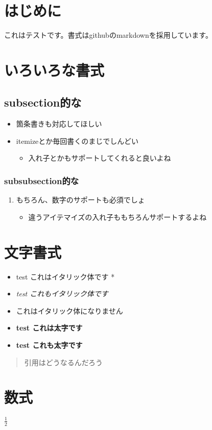 \section{はじめに}\label{ux306fux3058ux3081ux306b}

これはテストです。書式はgithubのmarkdownを採用しています。

\section{いろいろな書式}\label{ux3044ux308dux3044ux308dux306aux66f8ux5f0f}

\subsection{subsection的な}\label{subsectionux7684ux306a}

\begin{itemize}
\itemsep1pt\parskip0pt
\item
  箇条書きも対応してほしい
\item
  itemizeとか毎回書くのまじでしんどい

  \begin{itemize}
  \itemsep1pt\parskip0pt
  \item
    入れ子とかもサポートしてくれると良いよね
  \end{itemize}
\end{itemize}

\subsubsection{subsubsection的な}\label{subsubsectionux7684ux306a}

\begin{enumerate}
\def\labelenumi{\arabic{enumi}.}
\itemsep1pt\parskip0pt
\item
  もちろん、数字のサポートも必須でしょ

  \begin{itemize}
  \itemsep1pt\parskip0pt
  \item
    違うアイテマイズの入れ子ももちろんサポートするよね
  \end{itemize}
\end{enumerate}

\section{文字書式}\label{ux6587ux5b57ux66f8ux5f0f}

\begin{itemize}
\itemsep1pt\parskip0pt
\item
  test これはイタリック体です *
\item
  \emph{test これもイタリック体です}
\item
  これはイタリック体になりません
\item
  \textbf{test これは太字です}
\item
  \textbf{test これも太字です}
\end{itemize}

\begin{quote}
引用はどうなるんだろう
\end{quote}

\section{数式}\label{ux6570ux5f0f}

$\frac{1}{2}$
